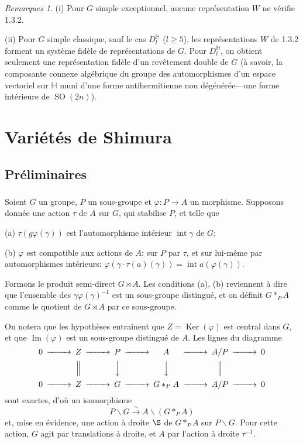 \documentclass[12pt,a4paper]{article}
\theoremstyle{plain}
\theoremstyle{definition}
\theoremstyle{remark}
\newtheorem{remarks}[theorem]{Remarques}
\DeclareMathOperator{\Ker}{Ker}
\DeclareMathOperator{\Image}{Im}
\DeclareMathOperator{\Int}{int}
\DeclareMathOperator{\SO}{SO}
\newcommand{\simto}{\xrightarrow{\sim}}
\begin{document}
\begin{remarks}
(i) Pour $G$ simple exceptionnel, aucune repr\'esentation $W$ ne v\'erifie 1.3.2.

(ii) Pour $G$ simple classique, sauf le cas $D_l^{\mathbb{H}}$ ($l \ge 5$), les repr\'esentations $W$ de 1.3.2 forment un syst\`eme fid\`ele de repr\'esentations de $G$. Pour $D_l^{\mathbb{H}}$, on obtient seulement une repr\'esentation fid\`ele d'un rev\^etement double de $G$ (\`a savoir, la composante connexe alg\'ebrique du groupe des automorphismes d'un espace vectoriel sur $\mathbb{H}$ muni d'une forme antihermitienne non d\'eg\'en\'er\'ee---une forme int\'erieure de $\SO(2n)$).
\end{remarks}

\section{Vari\'et\'es de Shimura}

\subsection{Pr\'eliminaires}

\subsubsection{}

Soient $G$ un groupe, $P$ un sous-groupe et $\varphi:P \to A$ un morphisme. Supposons donn\'ee une action $\tau$ de $A$ sur $G$, qui stabilise $P$, et telle que

(a) $\tau(g\varphi(\gamma))$ est l'automorphisme int\'erieur $\Int \gamma$ de $G$;

(b) $\varphi$ est compatible aux actions de $A$: sur $P$ par $\tau$, et sur lui-m\^eme par automorphismes int\'erieurs: $\varphi(\gamma \cdot \tau(a)(\gamma)) = \Int a(\varphi(\gamma))$.

Formons le produit semi-direct $G \rtimes A$. Les conditions (a), (b) reviennent \`a dire que l'ensemble des $\gamma \varphi(\gamma)^{-1}$ est un sous-groupe distingu\'e, et on d\'efinit $G *_P A$ comme le quotient de $G \rtimes A$ par ce sous-groupe.

On notera que les hypoth\`eses entra\^inent que $Z = \Ker(\varphi)$ est central dans $G$, et que $\Image(\varphi)$ est un sous-groupe distingu\'e de $A$. Les lignes du diagramme
\begin{equation}\label{eq:2.0.1.1}
\begin{CD}
0 @>>> Z @>>> P @>>> A @>>> A/P @>>> 0 \\
@. @| @VVV @VVV @| \\
0 @>>> Z @>>> G @>>> G *_P A @>>> A/P @>>> 0
\end{CD}
\end{equation}
sont exactes, d'o\`u un isomorphisme
\begin{equation}\label{eq:2.0.1.2}
P\backslash G \simto A\backslash(G *_P A)
\end{equation}
et, mise en \'evidence, une action \`a droite $\S$ de $G *_P A$ sur $P\backslash G$. Pour cette action, $G$ agit par translations \`a droite, et $A$ par l'action \`a droite $\tau^{-1}$.
\end{document}

